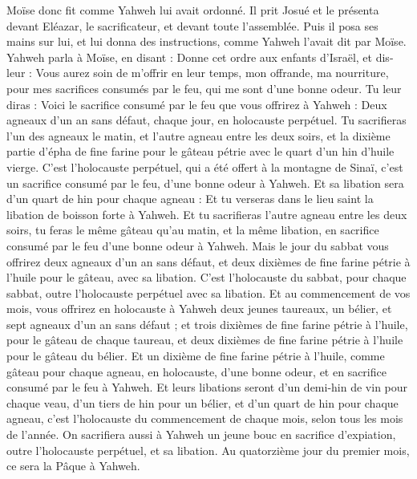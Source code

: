 \begin{multicols}{2}
Moïse donc fit comme Yahweh lui avait ordonné. Il prit Josué et le présenta devant Eléazar, le sacrificateur, et devant toute l'assemblée.
Puis il posa ses mains sur lui, et lui donna des instructions, comme Yahweh l'avait dit par Moïse.
\VerseOne{}Yahweh parla à Moïse, en disant :
Donne cet ordre aux enfants d'Israël, et dis-leur : Vous aurez soin de m'offrir en leur temps, mon offrande, ma nourriture, pour mes sacrifices consumés par le feu, qui me sont d'une bonne odeur.
Tu leur diras : Voici le sacrifice consumé par le feu que vous offrirez à Yahweh : Deux agneaux d'un an sans défaut, chaque jour, en holocauste perpétuel.
Tu sacrifieras l'un des agneaux le matin, et l'autre agneau entre les deux soirs,
et la dixième partie d'épha de fine farine pour le gâteau pétrie avec le quart d'un hin d'huile vierge.
C'est l'holocauste perpétuel, qui a été offert à la montagne de Sinaï, c'est un sacrifice consumé par le feu, d'une bonne odeur à Yahweh.
Et sa libation sera d'un quart de hin pour chaque agneau : Et tu verseras dans le lieu saint la libation de boisson forte à Yahweh.
Et tu sacrifieras l’autre agneau entre les deux soirs, tu feras le même gâteau qu'au matin, et la même libation, en sacrifice consumé par le feu d'une bonne odeur à Yahweh.
Mais le jour du sabbat vous offrirez deux agneaux d'un an sans défaut, et deux dixièmes de fine farine pétrie à l'huile pour le gâteau, avec sa libation.
C'est l'holocauste du sabbat, pour chaque sabbat, outre l'holocauste perpétuel avec sa libation.
Et au commencement de vos mois, vous offrirez en holocauste à Yahweh deux jeunes taureaux, un bélier, et sept agneaux d'un an sans défaut ;
et trois dixièmes de fine farine pétrie à l'huile, pour le gâteau de chaque taureau, et deux dixièmes de fine farine pétrie à l'huile pour le gâteau du bélier.
Et un dixième de fine farine pétrie à l'huile, comme gâteau pour chaque agneau, en holocauste, d'une bonne odeur, et en sacrifice consumé par le feu à Yahweh.
Et leurs libations seront d'un demi-hin de vin pour chaque veau, d'un tiers de hin pour un bélier, et d'un quart de hin pour chaque agneau, c'est l'holocauste du commencement de chaque mois, selon tous les mois de l'année.
On sacrifiera aussi à Yahweh un jeune bouc en sacrifice d'expiation, outre l'holocauste perpétuel, et sa libation.
Au quatorzième jour du premier mois, ce sera la Pâque à Yahweh.

\end{multicols}
